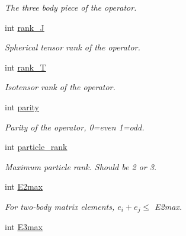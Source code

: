\begin{DoxyCompactItemize}
\begin{DoxyCompactList}\small\item\em The three body piece of the operator. \end{DoxyCompactList}\item 
int \hyperlink{classOperator_a71a7c194800e2758c42ad0d5f30299aa}{rank\+\_\+J}\hypertarget{classOperator_a71a7c194800e2758c42ad0d5f30299aa}{}\label{classOperator_a71a7c194800e2758c42ad0d5f30299aa}

\begin{DoxyCompactList}\small\item\em Spherical tensor rank of the operator. \end{DoxyCompactList}\item 
int \hyperlink{classOperator_ac70ee8dbbc4cb4f61972575c68bb9a51}{rank\+\_\+T}\hypertarget{classOperator_ac70ee8dbbc4cb4f61972575c68bb9a51}{}\label{classOperator_ac70ee8dbbc4cb4f61972575c68bb9a51}

\begin{DoxyCompactList}\small\item\em Isotensor rank of the operator. \end{DoxyCompactList}\item 
int \hyperlink{classOperator_ad628e91e2dd2542c0f34e985271adcd3}{parity}\hypertarget{classOperator_ad628e91e2dd2542c0f34e985271adcd3}{}\label{classOperator_ad628e91e2dd2542c0f34e985271adcd3}

\begin{DoxyCompactList}\small\item\em Parity of the operator, 0=even 1=odd. \end{DoxyCompactList}\item 
int \hyperlink{classOperator_a44a74c03caff49e776433e885a724956}{particle\+\_\+rank}\hypertarget{classOperator_a44a74c03caff49e776433e885a724956}{}\label{classOperator_a44a74c03caff49e776433e885a724956}

\begin{DoxyCompactList}\small\item\em Maximum particle rank. Should be 2 or 3. \end{DoxyCompactList}\item 
int \hyperlink{classOperator_ace64ea3f299cfba00bc973e58ce03414}{E2max}\hypertarget{classOperator_ace64ea3f299cfba00bc973e58ce03414}{}\label{classOperator_ace64ea3f299cfba00bc973e58ce03414}

\begin{DoxyCompactList}\small\item\em For two-\/body matrix elements, $ e_i + e_j \leq $ E2max. \end{DoxyCompactList}\item 
int \hyperlink{classOperator_ad3ebb434f911b9cb7c54ca6990cdda8c}{E3max}\hypertarget{classOperator_ad3ebb434f911b9cb7c54ca6990cdda8c}{}\label{classOperator_ad3ebb434f911b9cb7c54ca6990cdda8c}


\end{DoxyCompactItemize}
